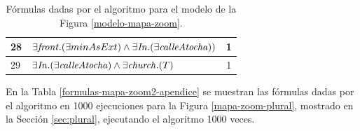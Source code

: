 \begin{table}[h]
\begin{center}
\begin{tabular}{|l|l|c|}
28&$\exists \mathit{front} . (\exists minAsExt) \land \exists \mathit{In} .(\exists \mathit{calleAtocha}))$ &1\\ \hline

29&$\exists  \mathit{In} .(\exists \mathit{calleAtocha}) \land \exists \mathit{church}.(T)$ &1\\ \hline

\end{tabular}

\caption{F\'ormulas dadas por el algoritmo para el modelo de la Figura \protect\ref{modelo-mapa-zoom}.}\label{formulas-mapa-zoom-ap}
\end{center}
\end{table}



En la Tabla \ref{formulas-mapa-zoom2-apendice} se muestran las f\'ormulas dadas por el algoritmo en 1000 ejecuciones para la Figura \ref{mapa-zoom-plural}, mostrado en la Secci\'on \ref{sec:plural}, ejecutando el algoritmo 1000 veces. 

